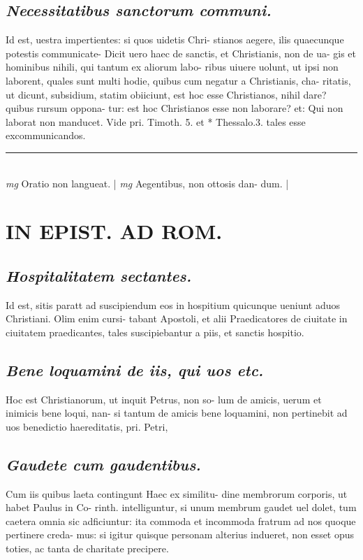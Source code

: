 \documentclass{article}
\begin{document}
\begin{pages}
\subsection*{\textit{Necessitatibus sanctorum communi. }}\pstart Id est, uestra impertientes: si quos uidetis Chri- stianos aegere, ilis quaecunque potestis communicate- Dicit uero haec de sanctis, et Christianis, non de ua- gis et hominibus nihili, qui tantum ex aliorum labo- ribus uiuere uolunt, ut ipsi non laborent, quales sunt multi hodie, quibus cum negatur a Christianis, cha- ritatis, ut dicunt, subsidium, statim obiiciunt, est hoc esse Christianos, nihil dare? quibus rursum oppona- tur: est hoc Christianos esse non laborare? et: Qui non laborat non manducet. Vide pri. Timoth. 5. et * Thessalo.3. tales esse excommunicandos.  \pend
\vspace{0.5cm}\noindent
\vspace{0.2cm}\rule{1cm}{0.2pt}\\ 
\hspace{0.2cm}\textit{mg}
\footnotesize Oratio non langueat. 
\normalsize| 
\hspace{0.2cm}\textit{mg}
\footnotesize Aegentibus, non ottosis dan- dum. 
\normalsize| 
\section*{IN EPIST. AD ROM.  }
\marginpar{[ p.140 ]}
{}
\subsection*{\textit{Hospitalitatem sectantes. }}\pstart Id est, sitis paratt ad suscipiendum eos in hospitium quicunque ueniunt aduos Christiani. Olim enim cursi- tabant Apostoli, et alii Praedicatores de ciuitate in ciuitatem praedicantes, tales suscipiebantur a piis, et sanctis hospitio.  \pend
{}
{}
\subsection*{\textit{Bene loquamini de iis, qui uos etc. }}\pstart Hoc est Christianorum, ut inquit Petrus, non so- lum de amicis, uerum et inimicis bene loqui, nan- si tantum de amicis bene loquamini, non pertinebit ad uos benedictio haereditatis, pri. Petri,  \pend
{}
{}
\subsection*{\textit{Gaudete cum gaudentibus. }}\pstart Cum iis quibus laeta contingunt Haec ex similitu- dine membrorum corporis, ut habet Paulus in Co- rinth. intelliguntur, si unum membrum gaudet uel dolet, tum caetera omnia sic adficiuntur: ita commoda et incommoda fratrum ad nos quoque pertinere creda- mus: si igitur quisque personam alterius indueret, non esset opus toties, ac tanta de charitate precipere.  \pend
{}
{}

\end{pages}
\end{document}
